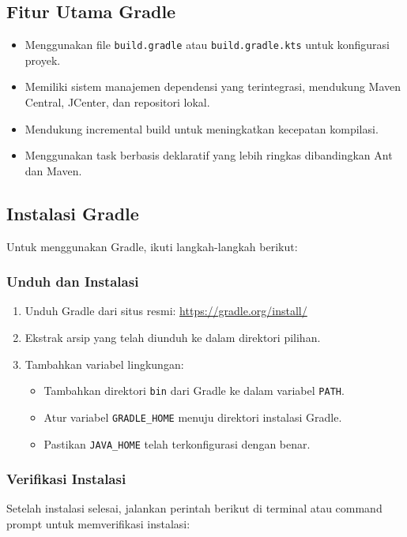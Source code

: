 \subsection{Fitur Utama Gradle}
\begin{itemize}
	\item Menggunakan file \texttt{build.gradle} atau \texttt{build.gradle.kts} untuk konfigurasi proyek.
	\item Memiliki sistem manajemen dependensi yang terintegrasi, mendukung Maven Central, JCenter, dan repositori lokal.
	\item Mendukung incremental build untuk meningkatkan kecepatan kompilasi.
	\item Menggunakan task berbasis deklaratif yang lebih ringkas dibandingkan Ant dan Maven.
\end{itemize}

\subsection{Instalasi Gradle}
Untuk menggunakan Gradle, ikuti langkah-langkah berikut:

\subsubsection{Unduh dan Instalasi}
\begin{enumerate}
	\item Unduh Gradle dari situs resmi: \url{https://gradle.org/install/}
	\item Ekstrak arsip yang telah diunduh ke dalam direktori pilihan.
	\item Tambahkan variabel lingkungan:
	\begin{itemize}
		\item Tambahkan direktori \texttt{bin} dari Gradle ke dalam variabel \texttt{PATH}.
		\item Atur variabel \texttt{GRADLE\_HOME} menuju direktori instalasi Gradle.
		\item Pastikan \texttt{JAVA\_HOME} telah terkonfigurasi dengan benar.
	\end{itemize}
\end{enumerate}

\subsubsection{Verifikasi Instalasi}
Setelah instalasi selesai, jalankan perintah berikut di terminal atau command prompt untuk memverifikasi instalasi:

